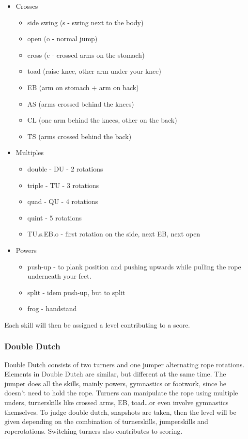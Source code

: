 \begin{itemize}
    \item Crosses
    \begin{itemize}
        \item side swing (s - swing next to the body)
        \item open (o - normal jump)
        \item cross (c - crossed arms on the stomach)
        \item toad (raise knee, other arm under your knee)
        \item EB (arm on stomach + arm on back)
        \item AS (arms crossed behind the knees)
        \item CL (one arm behind the knees, other on the back)
        \item TS (arms crossed behind the back)
    \end{itemize}
    \item Multiples
    \begin{itemize}
        \item double - DU - 2 rotations
        \item triple - TU - 3 rotations
        \item quad - QU - 4 rotations
        \item quint - 5 rotations
        \item TU.s.EB.o - first rotation on the side, next EB, next open
    \end{itemize}
    \item Powers
    \begin{itemize}
        \item push-up - to plank position and pushing upwards while pulling the rope underneath your feet.
        \item split - idem push-up, but to split
        \item frog - handstand
    \end{itemize}
\end{itemize}

Each skill will then be assigned a level contributing to a score. 

\subsubsection{Double Dutch}

Double Dutch consists of two turners and one jumper alternating rope rotations. Elements in Double Dutch are similar, but different at the same time. The jumper does all the skills, mainly powers, gymnastics or footwork, since he doesn't need to hold the rope. Turners can manipulate the rope using multiple unders, turnerskills like crossed arms, EB, toad\dots or even involve gymnastics themselves.
To judge double dutch, snapshots are taken, then the level will be given depending on the combination of turnerskills, jumperskills and roperotations.
Switching turners also contributes to scoring.

